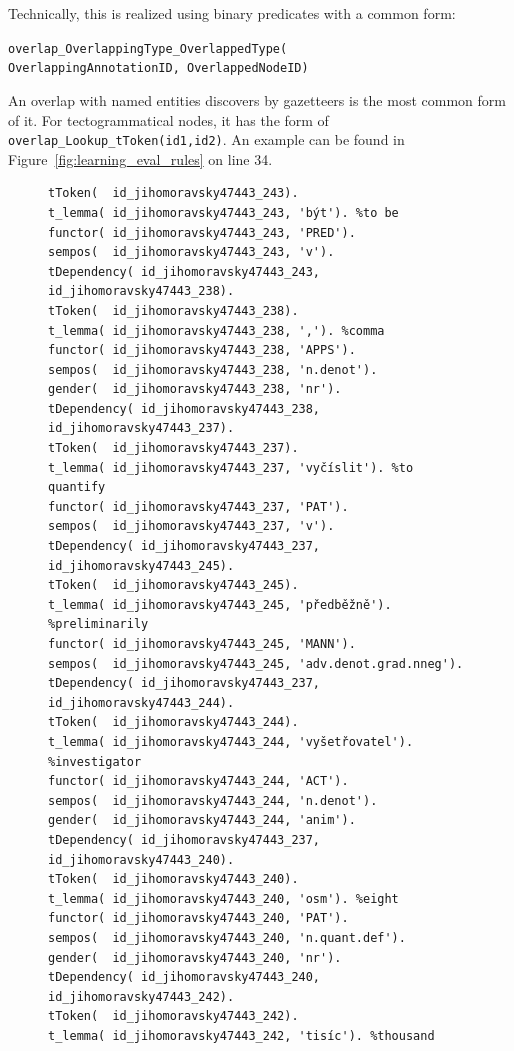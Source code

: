 Technically, this is realized using binary predicates with a common form:

\texttt{overlap\_OverlappingType\_OverlappedType(}
\\ \phantom{a} \hfill{} \phantom{b} \texttt{OverlappingAnnotationID, OverlappedNodeID)}

\noindent An overlap with named entities discovers by gazetteers is the most common form of it. For tectogrammatical nodes, it has the form of \texttt{overlap\_Lookup\_tToken(id1,id2)}. An example can be found in Figure~\ref{fig:learning_eval_rules} on line 34. 


\begin{figure}
\begin{verbatim}
tToken(  id_jihomoravsky47443_243).
t_lemma( id_jihomoravsky47443_243, 'být'). %to be
functor( id_jihomoravsky47443_243, 'PRED').
sempos(  id_jihomoravsky47443_243, 'v').
tDependency( id_jihomoravsky47443_243, id_jihomoravsky47443_238).
tToken(  id_jihomoravsky47443_238).
t_lemma( id_jihomoravsky47443_238, ','). %comma
functor( id_jihomoravsky47443_238, 'APPS').
sempos(  id_jihomoravsky47443_238, 'n.denot').
gender(  id_jihomoravsky47443_238, 'nr').
tDependency( id_jihomoravsky47443_238, id_jihomoravsky47443_237).
tToken(  id_jihomoravsky47443_237).
t_lemma( id_jihomoravsky47443_237, 'vyčíslit'). %to quantify
functor( id_jihomoravsky47443_237, 'PAT').
sempos(  id_jihomoravsky47443_237, 'v').
tDependency( id_jihomoravsky47443_237, id_jihomoravsky47443_245).
tToken(  id_jihomoravsky47443_245).
t_lemma( id_jihomoravsky47443_245, 'předběžně'). %preliminarily
functor( id_jihomoravsky47443_245, 'MANN').
sempos(  id_jihomoravsky47443_245, 'adv.denot.grad.nneg').
tDependency( id_jihomoravsky47443_237, id_jihomoravsky47443_244).
tToken(  id_jihomoravsky47443_244).
t_lemma( id_jihomoravsky47443_244, 'vyšetřovatel'). %investigator
functor( id_jihomoravsky47443_244, 'ACT').
sempos(  id_jihomoravsky47443_244, 'n.denot').
gender(  id_jihomoravsky47443_244, 'anim').
tDependency( id_jihomoravsky47443_237, id_jihomoravsky47443_240).
tToken(  id_jihomoravsky47443_240).
t_lemma( id_jihomoravsky47443_240, 'osm'). %eight
functor( id_jihomoravsky47443_240, 'PAT').
sempos(  id_jihomoravsky47443_240, 'n.quant.def').
gender(  id_jihomoravsky47443_240, 'nr').
tDependency( id_jihomoravsky47443_240, id_jihomoravsky47443_242).
tToken(  id_jihomoravsky47443_242).
t_lemma( id_jihomoravsky47443_242, 'tisíc'). %thousand

\end{verbatim}
\end{figure}
